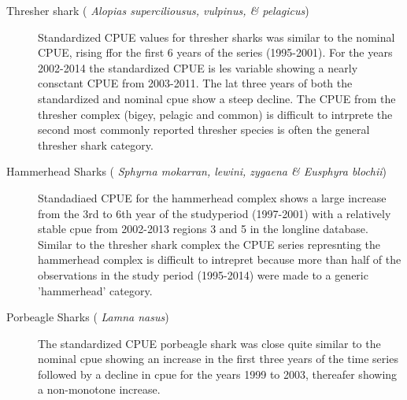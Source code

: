 \begin{description}
 
\item[ Thresher shark (\emph{ Alopias superciliousus, vulpinus, \& pelagicus}) ]  Standardized CPUE values for  thresher sharks was similar to the nominal CPUE, rising ffor the first 6 years of the series (1995-2001).  For the years 2002-2014 the standardized CPUE is les variable showing a nearly consctant CPUE from 2003-2011. The lat three years of both the standardized and nominal cpue show a steep decline.  The CPUE from the thresher complex (bigey, pelagic and common) is difficult to intrprete the second most commonly reported thresher species is often the general thresher shark category. 
 
\item[ Hammerhead Sharks (\emph{ Sphyrna mokarran, lewini, zygaena \& Eusphyra blochii}) ]  Standadiaed CPUE for the hammerhead complex shows a large increase from the 3rd to 6th year of the studyperiod (1997-2001) with a relatively stable cpue from 2002-2013 regions 3 and 5 in the longline database. Similar to the thresher shark complex the CPUE series represnting the hammerhead complex is difficult to intrepret because more than half of the observations in the study period (1995-2014) were made  to a generic 'hammerhead' category.
 
 \item[ Porbeagle Sharks (\emph{ Lamna nasus}) ] The standardized CPUE porbeagle shark    was close quite similar to the nominal cpue showing an increase in the first three years of the time series followed by a decline in cpue for the years 1999 to 2003, thereafer showing a non-monotone increase.
 
 
 
 
\end{description}


